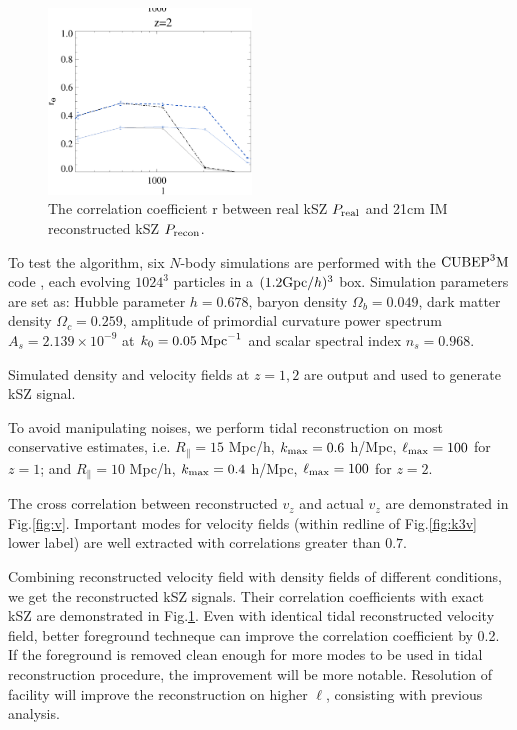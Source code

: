\begin{figure}[tbp]
\begin{center}
\includegraphics[width=0.48\textwidth]{figure/cl_correlation_z1_z2.eps}
\end{center}
\vspace{-0.7cm}
\caption{The correlation coefficient r between real kSZ $P_\mathrm{real}$ 
and 21cm IM reconstructed kSZ $P_\mathrm{recon}$.
}
\label{fig:r}
\end{figure}
\label{ssec:tide}

To test the algorithm, six $N$-body simulations are performed with the
$\mathrm{CUBEP}^3\mathrm{M}$ code \cite{2013:code}, each evolving $1024^3$ particles in a $(1.2\mathrm{Gpc}/h)^3$ box. 
Simulation parameters are set as: Hubble parameter $h=0.678$, baryon
density $\Omega_{b}=0.049$, dark matter density $\Omega_{c}=0.259$,
amplitude of primordial curvature power spectrum $A_s=2.139\times10^{-9}$ at 
$k_0=0.05\;\mathrm{Mpc}^{-1}$ and scalar spectral index $n_s=0.968$.

Simulated density and velocity fields at $z=1,2$ are output 
and used to generate kSZ signal. 


To avoid manipulating noises, 
we perform tidal reconstruction on most conservative estimates, i.e. 
$R_\parallel=15$ Mpc/h, $k_\mathrm{max}=0.6$ h/Mpc, $\ell_\mathrm{max}=100$ for $z=1$; 
and $R_\parallel=10$ Mpc/h, $k_\mathrm{max}=0.4$ h/Mpc, $\ell_\mathrm{max}=100$ for $z=2$. 

The cross correlation between reconstructed $v_z$ and actual $v_z$ are demonstrated in Fig.\ref{fig:v}. 
Important modes for velocity fields (within redline of Fig.\ref{fig:k3v} lower label) are well extracted with correlations greater than $0.7$. 

Combining reconstructed velocity field with density fields of different conditions, we get the reconstructed kSZ signals. 
Their correlation coefficients with exact kSZ are 
demonstrated in Fig.\ref{fig:r}. 
Even with identical tidal reconstructed velocity field, 
better foreground techneque can improve the correlation coefficient by 0.2. 
If the foreground is removed clean enough for more modes to be 
used in tidal reconstruction procedure, 
the improvement will be more notable.
Resolution of facility will improve the reconstruction on higher $\ell$, 
consisting with previous analysis.
